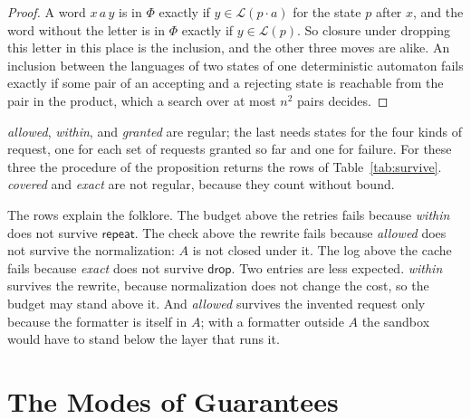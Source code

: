 \documentclass[acmsmall,nonacm,screen]{acmart}
\newcommand{\kw}[1]{\mathsf{#1}}
\newcommand{\drop}{\kw{drop}}
\newcommand{\rep}{\kw{repeat}}
\newcommand{\claim}[2]{#2}
\begin{document}
\begin{proof}
A word $x\,a\,y$ is in $\Phi$ exactly if $y \in \mathcal{L}(p \cdot a)$ for the state $p$
after $x$, and the word without the letter is in $\Phi$ exactly if $y \in \mathcal{L}(p)$. So
closure under dropping this letter in this place is the inclusion, and the other three moves
are alike. An inclusion between the languages of two states of one deterministic automaton
fails exactly if some pair of an accepting and a rejecting state is reachable from the pair
in the product, which a search over at most $n^2$ pairs decides.
\end{proof}

\emph{allowed}, \emph{within}, and \emph{granted} are regular; the last needs
\exGrantedStates{} states for the four kinds of request, one for each set of requests granted
so far and one for failure. \claim{decided}{For these three the procedure of the proposition
returns the rows of Table~\ref{tab:survive}.} \emph{covered} and \emph{exact} are not
regular, because they count without bound.

The rows explain the folklore. The budget above the retries fails because \emph{within} does
not survive $\rep$. The check above the rewrite fails because \emph{allowed} does not
survive the normalization: $A$ is not closed under it. The log above the cache fails because
\emph{exact} does not survive $\drop$. Two entries are less expected. \emph{within} survives
the rewrite, because normalization does not change the cost, so the budget may stand above
it. And \emph{allowed} survives the invented request only because the formatter is itself in
$A$; with a formatter outside $A$ the sandbox would have to stand below the layer that runs
it.

\section{The Modes of Guarantees}
\label{sec:modes}
\end{document}
